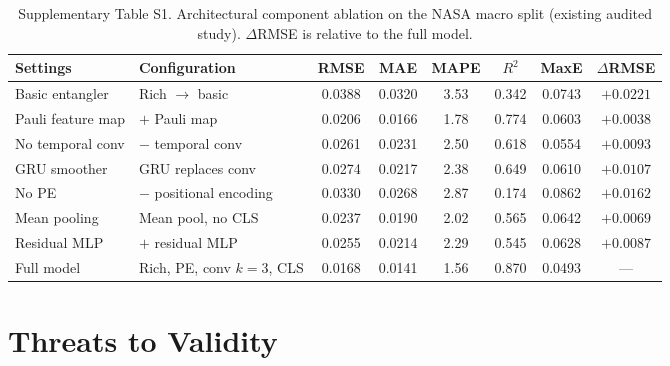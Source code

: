 \documentclass[a4paper,fleqn]{cas-sc}
\begin{document}
\begin{table}[htbp]
\centering
\footnotesize
\caption{Supplementary Table S1. Architectural component ablation on the NASA macro split (existing audited study). $\Delta$RMSE is relative to the full model.}\label{tab:s1_arch}\label{tab:nasa_ablation}
\begin{tabular*}{\textwidth}{@{}LLCCCCCC@{}}
\toprule
Settings & Configuration & RMSE & MAE & MAPE & $R^2$ & MaxE & $\Delta$RMSE \\
\midrule
Basic entangler & Rich $\rightarrow$ basic & 0.0388 & 0.0320 & 3.53 & 0.342 & 0.0743 & $+0.0221$ \\
Pauli feature map & $+$ Pauli map & 0.0206 & 0.0166 & 1.78 & 0.774 & 0.0603 & $+0.0038$ \\
No temporal conv & $-$ temporal conv & 0.0261 & 0.0231 & 2.50 & 0.618 & 0.0554 & $+0.0093$ \\
GRU smoother & GRU replaces conv & 0.0274 & 0.0217 & 2.38 & 0.649 & 0.0610 & $+0.0107$ \\
No PE & $-$ positional encoding & 0.0330 & 0.0268 & 2.87 & 0.174 & 0.0862 & $+0.0162$ \\
Mean pooling & Mean pool, no CLS & 0.0237 & 0.0190 & 2.02 & 0.565 & 0.0642 & $+0.0069$ \\
Residual MLP & $+$ residual MLP & 0.0255 & 0.0214 & 2.29 & 0.545 & 0.0628 & $+0.0087$ \\
Full model & Rich, PE, conv $k{=}3$, CLS & 0.0168 & 0.0141 & 1.56 & 0.870 & 0.0493 & --- \\
\bottomrule
\end{tabular*}
\end{table}

\clearpage

\section{Threats to Validity}\label{sec:threats}
\end{document}
